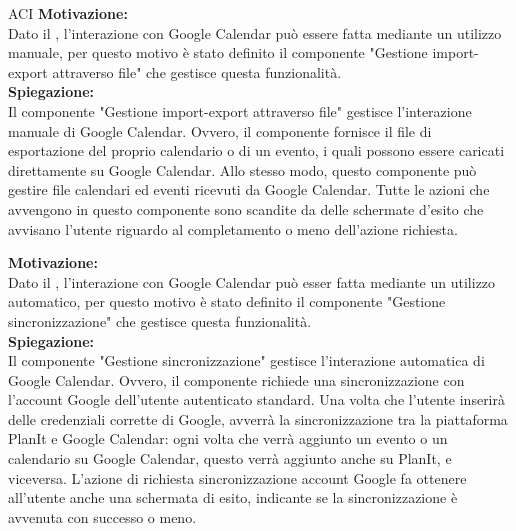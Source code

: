 \begin{listaPersonale}{ACI}
    \textbf{Motivazione:}\\
    Dato il , l'interazione con Google Calendar può essere fatta mediante un utilizzo manuale, per questo motivo è stato definito il componente "Gestione import-export attraverso file" che gestisce questa funzionalità.\\
    \textbf{Spiegazione:}\\
    Il componente "Gestione import-export attraverso file" gestisce l'interazione manuale di Google Calendar. Ovvero, il componente fornisce il file di esportazione del proprio calendario o di un evento, i quali possono essere caricati direttamente su Google Calendar. Allo stesso modo, questo componente può gestire file calendari ed eventi ricevuti da Google Calendar. Tutte le azioni che avvengono in questo componente sono scandite da delle schermate d'esito che avvisano l'utente riguardo al completamento o meno dell'azione richiesta.


    \textbf{Motivazione:}\\
    Dato il , l'interazione con Google Calendar può esser fatta mediante un utilizzo automatico, per questo motivo è stato definito il componente "Gestione sincronizzazione" che gestisce questa funzionalità.\\
    \textbf{Spiegazione:}\\
    Il componente "Gestione sincronizzazione" gestisce l'interazione automatica di Google Calendar. Ovvero, il componente richiede una sincronizzazione con l'account Google dell'utente autenticato standard. Una volta che l'utente inserirà delle credenziali corrette di Google, avverrà la sincronizzazione tra la piattaforma PlanIt e Google Calendar: ogni volta che verrà aggiunto un evento o un calendario su Google Calendar, questo verrà aggiunto anche su PlanIt, e viceversa. L'azione di richiesta sincronizzazione account Google fa ottenere all'utente anche una schermata di esito, indicante se la sincronizzazione è avvenuta con successo o meno.



\end{listaPersonale}
